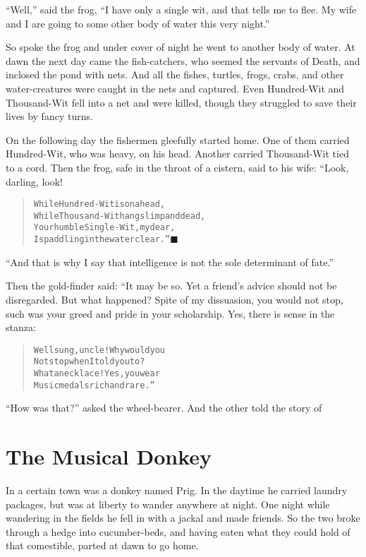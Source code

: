 \documentclass[article, twoside, 14pt]{memoir}
\newcommand{\qed}{\hfill \ensuremath{\blacksquare}}
\renewenvironment{verbatim}{%
\begin{quote}%
\vskip -10pt%
\begin{alltt}\normalfont\large}{\end{alltt}%
\end{quote}%
\vskip -10pt
} %
\begin{document}
``Well,'' said the frog,
``I have only a single wit, and that tells me to flee. My wife and I are going to some other body of water this very night.''

So spoke the frog and under cover of night he went to another
body of water. At dawn the next day came the fish-catchers, who
seemed the servants of Death, and inclosed the pond with nets. And
all the fishes, turtles, frogs, crabs, and other water-creatures
were caught in the nets and captured. Even Hundred-Wit and
Thousand-Wit fell into a net and were killed, though they struggled
to save their lives by fancy turns.

On the following day the fishermen gleefully started home. One of
them carried Hundred-Wit, who was heavy, on his head. Another
carried Thousand-Wit tied to a cord. Then the frog, safe in the
throat of a cistern, said to his wife: “Look, darling, look!

\begin{verbatim}
While Hundred-Wit is on a head,
While Thousand-Wit hangs limp and dead,
Your humble Single-Wit, my dear,
Is paddling in the water clear.”\hyperref[s83]{\qed}
\end{verbatim}
``And that is why I say that intelligence is not the sole determinant of fate.''

Then the gold-finder said: “It may be so. Yet a friend's advice
should not be disregarded. But what happened? Spite of my
dissuasion, you would not stop, such was your greed and pride in
your scholarship. Yes, there is sense in the stanza:

\begin{verbatim}
Well sung, uncle! Why would you
Not stop when I told you to?
What a necklace! Yes, you wear
Music medals rich and rare.”
\end{verbatim}
``How was that?'' asked the wheel-bearer. And the other told the
story of

\chapter{The Musical Donkey}

\label{s84}

In a certain town was a donkey named Prig. In the daytime he
carried laundry packages, but was at liberty to wander anywhere at
night. One night while wandering in the fields he fell in
with a jackal and made friends. So the two broke through a hedge
into cucumber-beds, and having eaten what they could hold of that
comestible, parted at dawn to go home.
\end{document}
